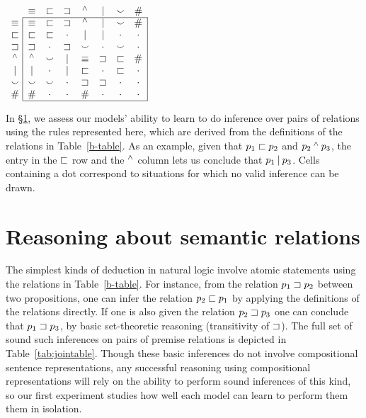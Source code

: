 
\begin{table}[tp]
  \centering  \small
  \setlength{\arraycolsep}{8pt}
  \renewcommand{\arraystretch}{1.1}
  \newcommand{\UNK}{\cdot}  
  $\begin{array}[t]{c@{ \ }|*{7}{c}|}
    \multicolumn{1}{c}{}
             & \nateq     & \natfor     & \natrev     & \natneg    & \natalt     & \natcov     & \multicolumn{1}{c}{\natind} \\
    \cline{2-8}
    \nateq  & \nateq &   \natfor &  \natrev &  \natneg &   \natalt &  \natcov &  \natind \\
    \natfor & \natfor &  \natfor &  \UNK &  \natalt &   \natalt &  \UNK &  \UNK \\
    \natrev & \natrev &  \UNK &  \natrev &  \natcov &   \UNK &  \natcov &  \UNK \\
    \natneg & \natneg &  \natcov &  \natalt &  \nateq &    \natrev &  \natfor &  \natind \\
    \natalt & \natalt &  \UNK &  \natalt &  \natfor &   \UNK &  \natfor &  \UNK \\
    \natcov & \natcov &  \natcov &  \UNK &  \natrev &   \natrev &  \UNK &  \UNK \\
    \natind & \natind & \UNK &  \UNK &  \natind &  \UNK &  \UNK &  \UNK \\
    \cline{2-8}
  \end{array}$
  \caption{In \S\ref{sec:join}, we assess our models' ability to learn to do inference over pairs of relations using the rules represented here, which are derived from the definitions of the relations in Table~\ref{b-table}.  As an example, given that $p_1 \sqsubset p_2$ and $p_2 \mathbin{^{\wedge}} p_3$, the entry in the $\sqsubset$ row and the $\mathbin{^{\wedge}}$ column lets us conclude that $p_1 \mathbin{|} p_3$. Cells containing a dot correspond to situations for which no valid inference can be drawn.} 
  \label{tab:jointable}
\end{table}

\section{Reasoning about semantic relations}\label{sec:join}

The simplest kinds of deduction in natural logic involve atomic statements 
using the relations in Table~\ref{b-table}. 
For instance, from the relation $p_1 \sqsupset p_2$ between two propositions, 
one can infer the relation $p_2 \sqsubset p_1$ by applying the definitions of the relations directly. 
If one is also given the relation $p_2 \sqsupset p_3$ one can conclude that $p_1 \sqsupset p_3$, by basic set-theoretic reasoning (transitivity of $\sqsupset$). The
full set of sound such inferences on pairs of premise relations is depicted in
Table~\ref{tab:jointable}. Though these basic inferences do not involve compositional
sentence representations, any successful reasoning using compositional representations
will rely on the ability to perform sound inferences of this kind, so our first experiment studies how well each model can learn to perform them them in isolation.

